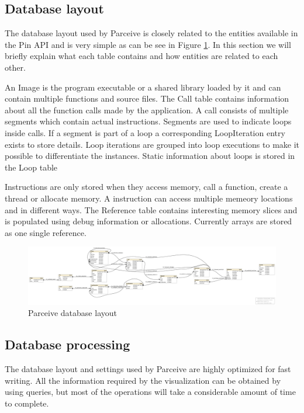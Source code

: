 \subsection{Database layout}

The database layout used by Parceive is closely related to the entities available in the Pin API and is very simple as can be see in Figure \ref{parceive:layout}. In this section we will briefly explain what each table contains and how entities are related to each other.

An Image is the program executable or a shared library loaded by it and can contain multiple functions and source files. The Call table contains information about all the function calls made by the application. A call consists of multiple segments which contain actual instructions. Segments are used to indicate loops inside calls. If a segment is part of a loop a corresponding LoopIteration entry exists to store details. Loop iterations are grouped into loop executions to make it possible to differentiate the instances. Static information about loops is stored in the Loop table

Instructions are only stored when they access memory, call a function, create a thread or allocate memory. A instruction can access multiple memeory locations and in different ways. The Reference table contains interesting memory slices and is populated using debug information or allocations. Currently arrays are stored as one single reference.

\begin{figure}
	\centering
	\includegraphics[width=1\textwidth]{parceive-schema}
	\caption{Parceive database layout}
	\label{parceive:layout}
\end{figure}

\subsection{Database processing}
\label{dataprocessing}

The database layout and settings used by Parceive are highly optimized for fast writing. All the information required by the visualization can be obtained by using queries, but most of the operations will take a considerable amount of time to complete.

